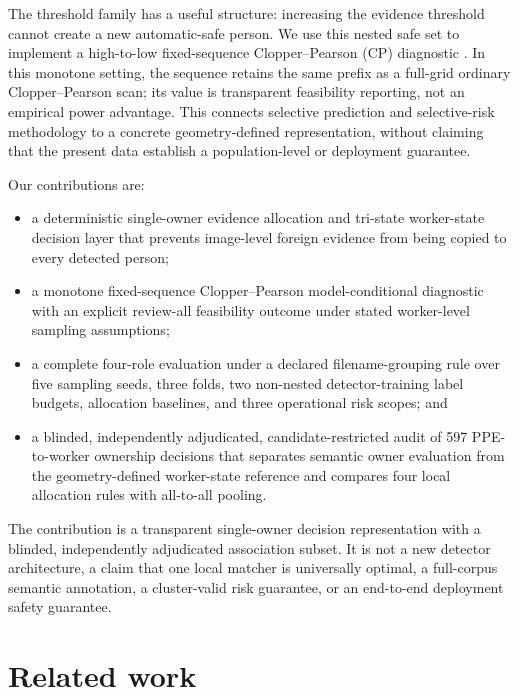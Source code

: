\documentclass[iicol,pdflatex,sn-mathphys-num]{sn-jnl}
\begin{document}
The threshold family has a useful structure: increasing the evidence threshold cannot create a new automatic-safe person. We use this nested safe set to implement a high-to-low fixed-sequence Clopper--Pearson (CP) diagnostic \cite{clopper1934confidence}. In this monotone setting, the sequence retains the same prefix as a full-grid ordinary Clopper--Pearson scan; its value is transparent feasibility reporting, not an empirical power advantage. This connects selective prediction \cite{geifman2017selective} and selective-risk methodology \cite{angelopoulos2021learntest,angelopoulos2022conformal} to a concrete geometry-defined representation, without claiming that the present data establish a population-level or deployment guarantee.

Our contributions are:

\begin{itemize}
\item a deterministic single-owner evidence allocation and tri-state worker-state decision layer that prevents image-level foreign evidence from being copied to every detected person;
\item a monotone fixed-sequence Clopper--Pearson model-conditional diagnostic with an explicit review-all feasibility outcome under stated worker-level sampling assumptions;
\item a complete four-role evaluation under a declared filename-grouping rule over five sampling seeds, three folds, two non-nested detector-training label budgets, allocation baselines, and three operational risk scopes; and
\item a blinded, independently adjudicated, candidate-restricted audit of 597 PPE-to-worker ownership decisions that separates semantic owner evaluation from the geometry-defined worker-state reference and compares four local allocation rules with all-to-all pooling.
\end{itemize}

The contribution is a transparent single-owner decision representation with a blinded, independently adjudicated association subset. It is not a new detector architecture, a claim that one local matcher is universally optimal, a full-corpus semantic annotation, a cluster-valid risk guarantee, or an end-to-end deployment safety guarantee.

\section{Related work}\label{sec:related}
\end{document}
